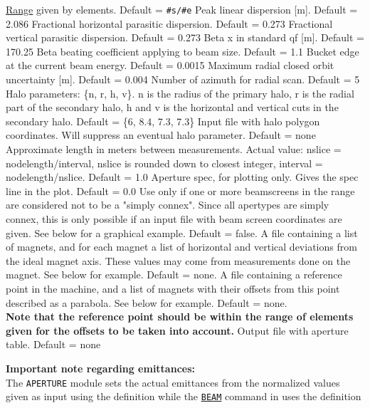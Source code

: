 \begin{5.02.05}
\begin{madlist}
	 \hyperref[sec:range]{Range} given by
	elements. Default = {\tt \#s/\#e}  
	 Peak linear dispersion [m]. Default = 2.086 
	 Fractional horizontal parasitic dispersion. Default = 0.273 
	 Fractional vertical parasitic dispersion. Default = 0.273 
	 Beta x in standard qf [m]. Default = 170.25 
	 Beta beating coefficient applying to beam size. Default = 1.1 
	 Bucket edge at the current beam energy. Default = 0.0015 
	 Maximum radial closed orbit uncertainty [m]. Default = 0.004 
	 Number of azimuth for radial scan. Default = 5 
	 Halo parameters: \{n, r, h, v\}. n is the radius of the
	primary halo,  r is the radial part of the secondary halo, h and v
	is the horizontal and  vertical cuts in the secondary halo. Default
	= \{6, 8.4, 7.3, 7.3\}  
	 Input file with halo polygon coordinates. Will
	suppress  an eventual halo parameter. Default = none  
	 Approximate length in meters between
	measurements. Actual value:  nslice = nodelength/interval, nslice
	is rounded down to closest integer,  interval =
	nodelength/nslice. Default = 1.0  
	 Aperture spec, for plotting only. Gives the spec line in
	the plot. Default = 0.0  
	 Use only if one or more beamscreens in the range are
	considered not to  be a "simply connex". Since all \madx apertypes
	are simply connex, this is only possible  if an input file with
	beam screen coordinates are given. See below for a graphical
	example. Default = false.  
	 A file containing a list of magnets, and for each
	magnet a list of horizontal and vertical deviations from the ideal
	magnet axis. These values may come from measurements done on the
	magnet. See below for example. Default = none.  
	 A file containing a reference point in the machine,
	and a list of magnets with their offsets from this point described
	as a parabola. See below for example. Default = none. \\
	{\bf Note that the reference point should be within the range of
	elements given for the offsets to be taken into account.}
	 Output file with aperture table. Default = none 
	\end{madlist}
\end{5.02.05}

\begin{5.02.04}
{\bf Important note regarding emittances:}\\
The {\tt APERTURE} module sets the actual emittances from the normalized values
given as input using the definition 
while the \hyperref[chap:beam]{\tt BEAM} command in \madx uses the definition 
\end{5.02.04}


